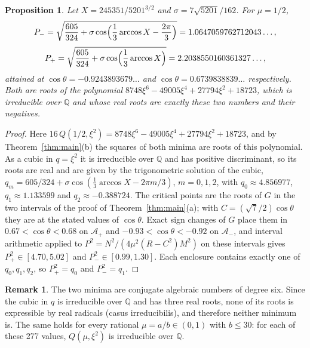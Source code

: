 \documentclass[11pt]{article}
\newtheorem{proposition}{Proposition}
\theoremstyle{definition}
\newtheorem{remark}{Remark}
\newcommand{\Q}{\mathbb{Q}}
\newcommand{\Ap}{\mathcal{A}_+}
\newcommand{\Am}{\mathcal{A}_-}
\begin{document}
\begin{proposition}\label{prop:half}
Let $X = 245351/5201^{3/2}$ and $\sigma = 7\sqrt{5201}/162$. For $\mu = 1/2$,
\[
  P_- = \sqrt{\frac{605}{324} + \sigma\cos\Bigl(\frac13 \arccos X - \frac{2\pi}{3}\Bigr)} = 1.0647059762712043\ldots,
\]
\[
  P_+ = \sqrt{\frac{605}{324} + \sigma\cos\Bigl(\frac13 \arccos X\Bigr)} = 2.2038550160361327\ldots,
\]
attained at $\cos\theta = -0.9243893679\ldots$ and $\cos\theta = 0.6739838839\ldots$ respectively. Both are roots of the polynomial $8748\xi^6 - 49005\xi^4 + 27794\xi^2 + 18723$, which is irreducible over $\Q$ and whose real roots are exactly these two numbers and their negatives.
\end{proposition}

\begin{proof}
Here $16\,Q(1/2, \xi^2) = 8748\xi^6 - 49005\xi^4 + 27794\xi^2 + 18723$, and by Theorem~\ref{thm:main}(b) the squares of both minima are roots of this polynomial. As a cubic in $q = \xi^2$ it is irreducible over $\Q$ and has positive discriminant, so its roots are real and are given by the trigonometric solution of the cubic, $q_m = 605/324 + \sigma\cos(\frac13 \arccos X - 2\pi m/3)$, $m = 0, 1, 2$, with $q_0 \approx 4.856977$, $q_1 \approx 1.133599$ and $q_2 \approx -0.388724$. The critical points are the roots of $G$ in the two intervals of the proof of Theorem~\ref{thm:main}(a); with $C = (\sqrt{7}/2)\cos\theta$ they are at the stated values of $\cos\theta$. Exact sign changes of $G$ place them in $0.67 < \cos\theta < 0.68$ on $\Ap$ and $-0.93 < \cos\theta < -0.92$ on $\Am$, and interval arithmetic applied to $P^2 = N^2/(4\mu^2 (R - C^2) M^2)$ on these intervals gives $P_+^2 \in [4.70, 5.02]$ and $P_-^2 \in [0.99, 1.30]$. Each enclosure contains exactly one of $q_0, q_1, q_2$, so $P_+^2 = q_0$ and $P_-^2 = q_1$.
\end{proof}

\begin{remark}\label{rem:radicals}
The two minima are conjugate algebraic numbers of degree six. Since the cubic in $q$ is irreducible over $\Q$ and has three real roots, none of its roots is expressible by real radicals (casus irreducibilis), and therefore neither minimum is. The same holds for every rational $\mu = a/b \in (0, 1)$ with $b \le 30$: for each of these 277 values, $Q(\mu, \xi^2)$ is irreducible over $\Q$.
\end{remark}
\end{document}
